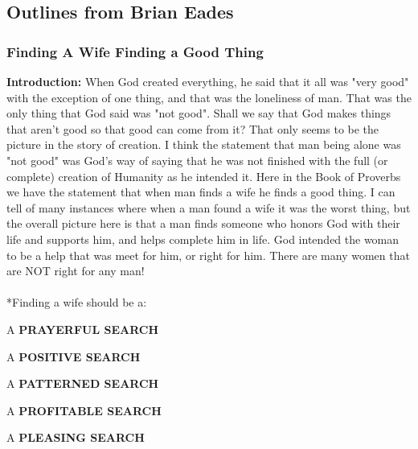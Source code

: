 \subsection{Outlines from Brian Eades}

\subsubsection{Finding A Wife Finding a Good Thing}



\noindent  \textbf{Introduction: } When God created everything, he said that it all was "very good" with the exception of one thing, and that was the loneliness of man. That was the only thing that God said was "not good". Shall we say that God makes things that aren't good so that good can come from it? 
That only seems to be the picture in the story of creation. I think the statement that man being alone was "not good" was God's way of saying that he was not finished with the full  (or complete) creation of Humanity as he intended it.
Here in the Book of Proverbs we have the statement that when man finds a wife he finds a good thing. I can tell of many instances where when a man found a wife it was the worst thing, but the overall picture here is that a man finds someone who honors God with their life and supports him, and helps complete him in life. God intended the woman to be a help that was meet for him, or right for him. There are many women that are NOT right for any man!\\
\\
*Finding a wife should be a: \\
\begin{compactenum}[I.]
    \item A \textbf{PRAYERFUL SEARCH}
    \item A \textbf{POSITIVE SEARCH}
    \item A \textbf{PATTERNED SEARCH}
    \item A \textbf{PROFITABLE SEARCH}
    \item A \textbf{PLEASING SEARCH}
\end{compactenum}
